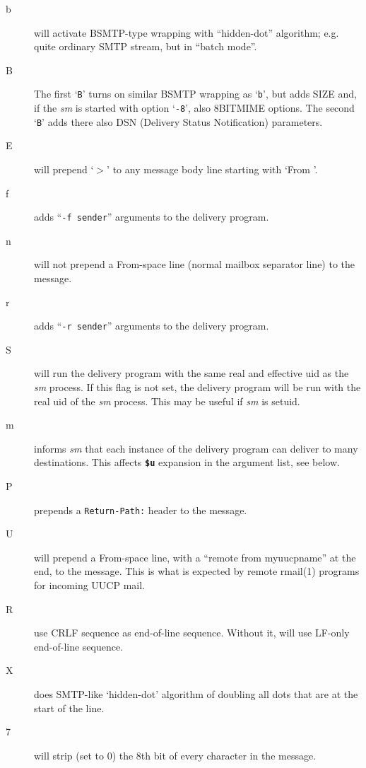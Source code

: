 \begin{description}
\item[b] \mbox{}

will activate BSMTP-type wrapping with ``hidden-dot''
algorithm; e.g. quite ordinary SMTP stream, but in
``batch mode''.



\item[B] \mbox{}

The first `{\tt B}' turns on similar BSMTP wrapping as
`{\tt b}', but adds SIZE and, if the {\em sm} is started with
option `{\tt -8}', also 8BITMIME options. The second `{\tt B}'
adds there also DSN (Delivery Status Notification)
parameters.



\item[E] \mbox{}
will prepend `{\(>\)}' to any message body line starting
with `From '.

\item[f] \mbox{}
adds ``{\tt -f sender}'' arguments to the delivery program.

\item[n] \mbox{}
will not prepend a From-space line (normal mailbox
separator line) to the message.

\item[r] \mbox{}
adds ``{\tt -r sender}'' arguments to the delivery program.

\item[S] \mbox{}
will run the delivery program with the same real
and effective uid as the {\em sm} process. If this flag
is not set, the delivery program will be run with
the real uid of the {\em sm} process. This may be useful
if {\em sm} is setuid.

\item[m] \mbox{}
informs {\em sm} that each instance of the delivery program 
can deliver to many destinations. This
affects {\bf {\tt \$u}} expansion in the argument list, see
below.

\item[P] \mbox{}
prepends a {\tt Return-Path:} header to the message.

\item[U] \mbox{}
will prepend a From-space line, with a ``remote from
myuucpname'' at the end, to the message. This is
what is expected by remote rmail(1) programs for
incoming UUCP mail.

\item[R] \mbox{}
use CRLF sequence as end-of-line sequence. Without it, will use 
LF-only end-of-line sequence.

\item[X] \mbox{}
does SMTP-like `hidden-dot' algorithm of doubling all dots that are 
at the start of the line.


\item[7] \mbox{}
will strip (set to 0) the 8th bit of every character in the message.

\end{description}


